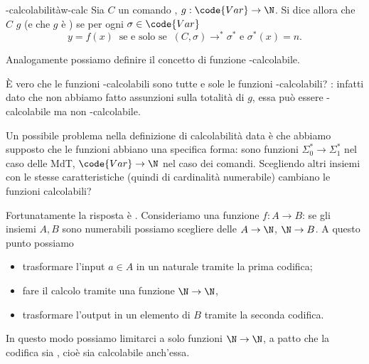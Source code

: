 \begin{definition}
    {-calcolabilità}{w-calc}
    Sia $C$ un comando , $g : \code{Var} \to \N$. 
    Si dice allora che $C$  $g$ (e che $g$ è ) se per ogni $\sigma \in \code{Var}$ \[
        y = f(x) \;\;\text{se e solo se}\;\; (C, \sigma) \to^\ast \sigma^\ast \text{ e } \sigma^\ast(x) = n.
    \]   
\end{definition}

Analogamente possiamo definire il concetto di funzione -calcolabile.

È vero che le funzioni -calcolabili sono tutte e sole le funzioni -calcolabili? : infatti dato che non abbiamo fatto assunzioni sulla totalità di $g$, essa può essere -calcolabile ma non -calcolabile.

Un possibile problema nella definizione di calcolabilità data è che abbiamo supposto che le funzioni abbiano una specifica forma: sono funzioni $\Sigma_0^\ast \to \Sigma_1^\ast$ nel caso delle MdT, $\code{Var} \to \N$ nel caso dei comandi. Scegliendo altri insiemi con le stesse caratteristiche (quindi di cardinalità numerabile) cambiano le funzioni calcolabili?

Fortunatamente la risposta è . Consideriamo una funzione $f : A \to B$: se gli insiemi $A, B$ sono numerabili possiamo scegliere delle  $A \to \N$, $\N \to B$. A questo punto possiamo \begin{itemize}
    \item trasformare l'input $a \in A$ in un naturale tramite la prima codifica;
    \item fare il calcolo tramite una funzione $\N \to \N$,
    \item trasformare l'output in un elemento di $B$ tramite la seconda codifica. 
\end{itemize}

In questo modo possiamo limitarci a solo funzioni $\N \to \N$, a patto che la codifica sia , cioè sia calcolabile anch'essa.